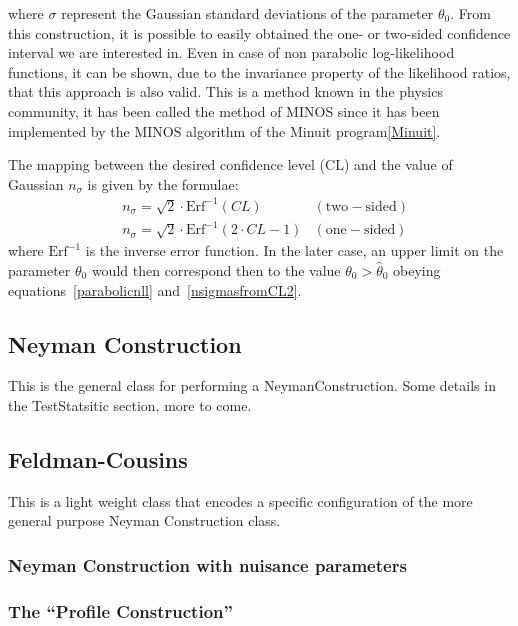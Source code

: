 \documentclass[11pt]{article}
\begin{document}
where $\sigma$ represent the Gaussian standard deviations of the
parameter $\theta_{0}$. From this construction, it is possible to
easily obtained the one- or two-sided confidence interval we are
interested in. Even in case of non parabolic log-likelihood
functions, it can be shown, due to the invariance property of the
likelihood ratios, that this approach is also valid. This is a
method known in the physics community, it has been called the method
of MINOS since it  has been implemented by the MINOS algorithm of the Minuit
program\ref{Minuit}. 

The mapping between the desired 
confidence level (CL) and the value of Gaussian $n_\sigma$ is given by the formulae:
\begin{eqnarray}
    \label{nsigmasfromCL1}
    &n_\sigma = \sqrt{2}\cdot \mathrm{Erf}^{-1}(CL) & \mathrm{(two-sided)} \\
    &n_\sigma = \sqrt{2}\cdot \mathrm{Erf}^{-1}(2 \cdot CL -1) & \mathrm{(one-sided)}
    \label{nsigmasfromCL2}
\end{eqnarray}
where $\mathrm{Erf}^{-1}$ is the inverse error function. In
the later case, an upper limit on the parameter $\theta_0$ would then
correspond then to the value $\theta_0>\hat{\theta}_0$ obeying
equations~\ref{parabolicnll} and~\ref{nsigmasfromCL2}.



	\subsection{Neyman Construction}

This is the general class for performing a NeymanConstruction.
Some details in the TestStatsitic section, more to come.

	\subsection{Feldman-Cousins}

This is a light weight class that encodes a specific configuration of the more general purpose  Neyman Construction class.


\subsubsection{Neyman Construction with nuisance parameters} 


\subsubsection{The ``Profile Construction''}
\end{document}

